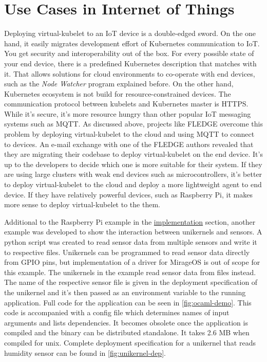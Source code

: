 \section{Use Cases in Internet of Things}

Deploying virtual-kubelet to an IoT device is a double-edged sword. On the one hand, it easily migrates development effort of Kubernetes communication to IoT. You get security and interoperability out of the box. For every possible state of your end device, there is a predefined Kubernetes description that matches with it. That allows solutions for cloud environments to co-operate with end devices, such as the \textit{Node Watcher} program explained before. On the other hand, Kubernetes ecosystem is not build for resource-constrained devices. The communication protocol between kubelets and Kubernetes master is HTTPS. While it's secure, it's more resource hungry than other popular IoT messaging systems such as MQTT. As discussed above, projects like FLEDGE overcome this problem by deploying virtual-kubelet to the cloud and using MQTT to connect to devices. An e-mail exchange with one of the FLEDGE authors revealed that they are migrating their codebase to deploy virtual-kubelet on the end device. It's up to the developers to decide which one is more suitable for their system. If they are using large clusters with weak end devices such as microcontrollers, it's better to deploy virtual-kubelet to the cloud and deploy a more lightweight agent to end device. If they have relatively powerful devices, such as Raspberry Pi, it makes more sense to deploy virtual-kubelet to the them.

Additional to the Raspberry Pi example in the \hyperref[chapter:implementation]{implementation} section, another example was developed to show the interaction between unikernels and sensors. A python script was created to read sensor data from multiple sensors and write it to respective files. Unikernels can be programmed to read sensor data directly from GPIO pins, but implementation of a driver for MirageOS is out of scope for this example. The unikernels in the example read sensor data from files instead. The name of the respective sensor file is given in the deployment specification of the unikernel and it's then passed as an environment variable to the running application. Full code for the application can be seen in \ref{fig:ocaml-demo}. This code is accompanied with a config file which determines names of input arguments and lists dependencies. It becomes obsolete once the application is compiled and the binary can be distributed standalone. It takes 2.6 MB when compiled for unix. Complete deployment specification for a unikernel that reads humidity sensor can be found in \ref{fig:unikernel-dep}.

